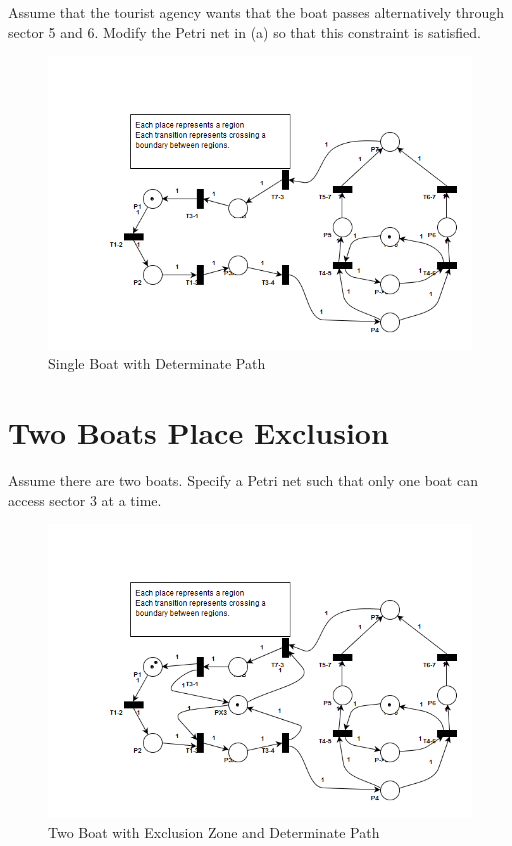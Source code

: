 \documentclass{article}
\begin{document}
Assume that the tourist agency wants that the
boat passes alternatively through sector 5 and 6.
Modify the Petri net in (a) so that this constraint is satisfied.

\begin{figure}[h!]
\centering
\includegraphics[scale=0.5]{hw6_petri_net_2.png}
\caption{Single Boat with Determinate Path}
\label{fig:pn2}
\end{figure}


\section{Two Boats Place Exclusion}

Assume there are two boats.
Specify a Petri net such that only one boat
can access sector 3 at a time.

\begin{figure}[h!]
\centering
\includegraphics[scale=0.5]{hw6_petri_net_3.png}
\caption{Two Boat with Exclusion Zone and Determinate Path}
\label{fig:pn3}
\end{figure}
\end{document}
